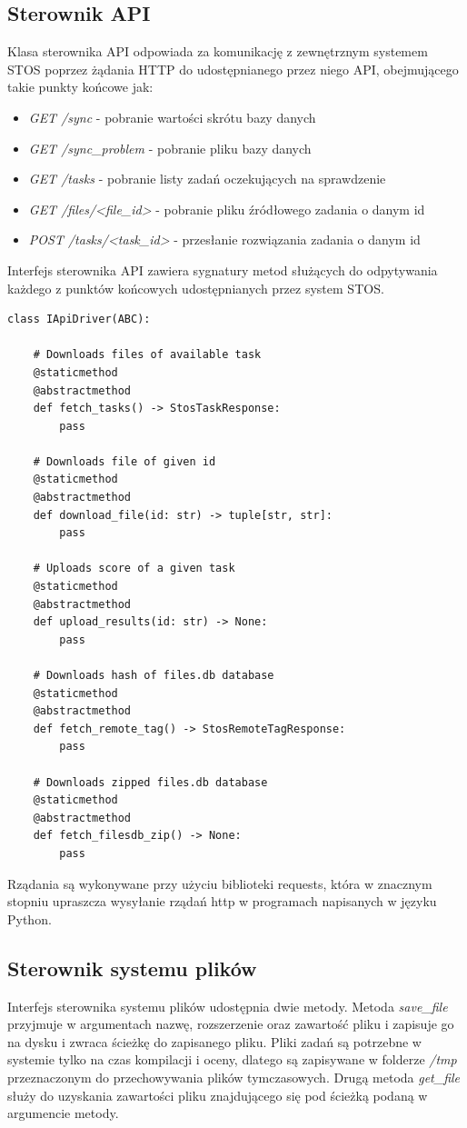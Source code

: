 \subsection{Sterownik API}
Klasa sterownika API odpowiada za komunikację z zewnętrznym systemem STOS poprzez żądania HTTP do udostępnianego przez niego API, obejmującego takie punkty końcowe jak:
\begin{itemize}
    \item \textit{GET /sync} - pobranie wartości skrótu bazy danych
    \item \textit{GET /sync\_problem} - pobranie pliku bazy danych
    \item \textit{GET /tasks} - pobranie listy zadań oczekujących na sprawdzenie
    \item \textit{GET /files/<file\_id>} - pobranie pliku źródłowego zadania o danym id
    \item \textit{POST /tasks/<task\_id>} - przesłanie rozwiązania zadania o danym id
\end{itemize}
Interfejs sterownika API zawiera sygnatury metod służących do odpytywania każdego z punktów końcowych udostępnianych przez system STOS.
\lstset{style=python}
\begin{lstlisting}[caption = {Interfejs sterownika API.}]
    class IApiDriver(ABC):

    # Downloads files of available task
    @staticmethod
    @abstractmethod
    def fetch_tasks() -> StosTaskResponse:
        pass

    # Downloads file of given id
    @staticmethod
    @abstractmethod
    def download_file(id: str) -> tuple[str, str]:
        pass

    # Uploads score of a given task
    @staticmethod
    @abstractmethod
    def upload_results(id: str) -> None:
        pass

    # Downloads hash of files.db database
    @staticmethod
    @abstractmethod
    def fetch_remote_tag() -> StosRemoteTagResponse: 
        pass

    # Downloads zipped files.db database
    @staticmethod
    @abstractmethod
    def fetch_filesdb_zip() -> None:
        pass
\end{lstlisting}
Rządania są wykonywane przy użyciu biblioteki requests\cite{pythonRequests}, która w znacznym stopniu upraszcza wysyłanie rządań http w programach napisanych w języku Python.

\subsection{Sterownik systemu plików}
Interfejs sterownika systemu plików udostępnia dwie metody. Metoda \textit{save\_file} przyjmuje w argumentach nazwę, rozszerzenie oraz zawartość pliku i zapisuje go na dysku i zwraca ścieżkę do zapisanego pliku. Pliki zadań są potrzebne w systemie tylko na czas kompilacji i oceny, dlatego są zapisywane w folderze \textit{/tmp} przeznaczonym do przechowywania plików tymczasowych. Drugą metoda \textit{get\_file} służy do uzyskania zawartości pliku znajdującego się pod ścieżką podaną w argumencie metody.

